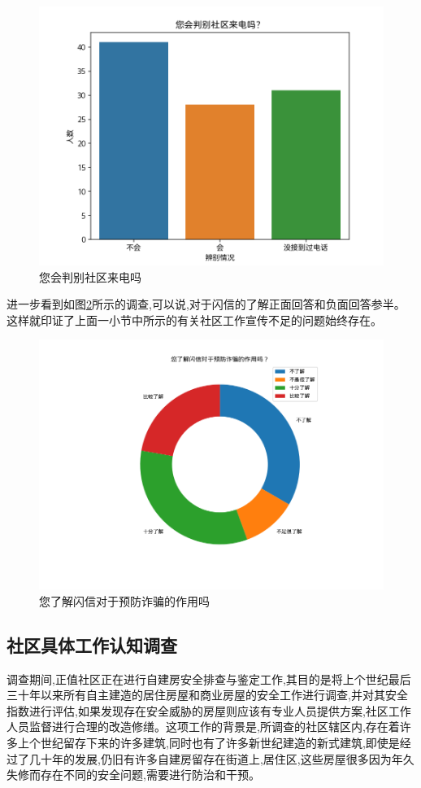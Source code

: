 \documentclass[AutoFakeBold]{LZUThesis}
\begin{document}
\begin{figure}[!h]
	\centering
	\includegraphics[width=4 in]{figures/judgePhone.png}
	\caption{您会判别社区来电吗}
	\label{fig:judgePhone}
\end{figure}

进一步看到如图\ref{fig:messageTel}所示的调查,可以说,对于闪信的了解正面回答和负面回答参半。这样就印证了上面一小节中所示的有关社区工作宣传不足的问题始终存在。

\begin{figure}[!h]
	\centering
	\includegraphics[width=4 in]{figures/messageTel.png}
	\caption{您了解闪信对于预防诈骗的作用吗}
	\label{fig:messageTel}
\end{figure}

\subsection{社区具体工作认知调查}
调查期间,正值社区正在进行自建房安全排查与鉴定工作,其目的是将上个世纪最后三十年以来所有自主建造的居住房屋和商业房屋的安全工作进行调查,并对其安全指数进行评估,如果发现存在安全威胁的房屋则应该有专业人员提供方案,社区工作人员监督进行合理的改造修缮。这项工作的背景是,所调查的社区辖区内,存在着许多上个世纪留存下来的许多建筑,同时也有了许多新世纪建造的新式建筑,即使是经过了几十年的发展,仍旧有许多自建房留存在街道上,居住区,这些房屋很多因为年久失修而存在不同的安全问题,需要进行防治和干预。
\end{document}

